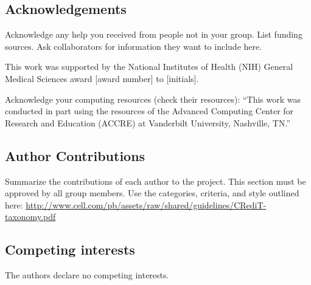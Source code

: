 \subsection{Acknowledgements}
Acknowledge any help you received from people not in your group. List funding sources. Ask collaborators for information they want to include here.

This work was supported by the National Institutes of Health (NIH) General Medical Sciences award [award number] to [initials].

Acknowledge your computing resources (check their resources): “This work was conducted in part using the resources of the Advanced Computing Center for Research and Education (ACCRE) at Vanderbilt University, Nashville, TN.”

\subsection{Author Contributions}

Summarize the contributions of each author to the project. This section must be approved by all group members. Use the categories, criteria, and style outlined here: \url{http://www.cell.com/pb/assets/raw/shared/guidelines/CRediT-taxonomy.pdf}

\subsection{Competing interests}

The authors declare no competing interests.



